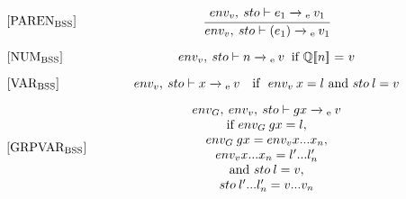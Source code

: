 \begin{equation}
\begin{minipage}{.2\linewidth}
$[\text{PAREN}_\text{BSS}]$
\end{minipage}
\begin{minipage}{.8\linewidth}
\centering
$\cfrac{env_v, \: sto \vdash e_1 \xrightarrow{}\textsubscript{e} \: v_1}{env_v, \: sto \vdash (e_1) \xrightarrow{}\textsubscript{e} \: v_1}$
\end{minipage}
\end{equation}

\begin{equation}
\begin{minipage}{.2\linewidth}
$[\text{NUM}_\text{BSS}]$
\end{minipage}
\begin{minipage}{.8\linewidth}
\centering
$env_v, \: sto \vdash n \xrightarrow{}\textsubscript{e} \: v$ $ \: \text{if}$ $\mathbb{Q}[\![n]\!]$ $=$ $v$ 
\end{minipage}
\end{equation}

\begin{equation}
\begin{minipage}{.2\linewidth}
$[\text{VAR}_\text{BSS}]$
\end{minipage}
\begin{minipage}{.8\linewidth}
\centering
$env_v, \: sto \vdash x \xrightarrow{}\textsubscript{e} \: v$ $ \:\:\: \text{if} \:\:\: env_v \: x = l$ and $sto \: l = v$ 
\end{minipage}
\end{equation}

\begin{equation}
\begin{minipage}{.2\linewidth}
$[\text{GRPVAR}_\text{BSS}]$
\end{minipage}
\begin{minipage}{.8\linewidth}
\centering
$env_G, \: env_v, \: sto \vdash gx \xrightarrow{}\textsubscript{e} \: v$ \\ if $env_G \: gx = l,$ \\ $env_G \: gx = env_v x...x_n,$ \\ $env_v x...x_n = l'...l'_n$ \\ and $sto \: l = v,$ \\$sto \: l'...l'_n = v...v_n$ 
\end{minipage}
\end{equation}


